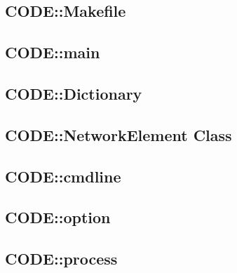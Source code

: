 \documentclass[10pt,a4paper]{article}
\begin{document}
\subsection*{CODE::Makefile}


\subsection*{CODE::main}


\subsection*{CODE::Dictionary}



\subsection*{CODE::NetworkElement Class}



\subsection*{CODE::cmdline}



\subsection*{CODE::option}



\subsection*{CODE::process}


\end{document}
